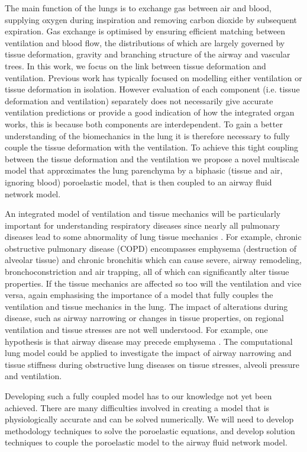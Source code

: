 The main function of the lungs is to exchange gas between air and blood, supplying oxygen during inspiration and removing carbon dioxide by subsequent expiration. Gas exchange is optimised by ensuring efficient matching between ventilation and blood flow, the distributions of which are largely governed by tissue deformation, gravity and branching structure of the airway and vascular trees. In this work, we focus on the link between tissue deformation and ventilation. Previous work has typically focused on modelling either ventilation or tissue deformation in isolation. However evaluation of each component (i.e. tissue deformation and ventilation) separately does not necessarily give accurate ventilation predictions or provide a good indication of how the integrated organ works, this is because both components are interdependent. To gain a better understanding of the biomechanics in the lung it is therefore necessary to fully couple the tissue deformation with the ventilation. To achieve this tight coupling between the tissue deformation and the ventilation we propose a novel multiscale model that approximates the lung parenchyma by a biphasic (tissue and air, ignoring blood) poroelastic model, that is then coupled to an airway fluid network model. 

An integrated model of ventilation and tissue mechanics will be particularly important for understanding respiratory diseases since nearly all pulmonary diseases lead to some abnormality of lung tissue mechanics \cite{suki2011lung}. For example, chronic obstructive pulmonary disease (COPD) encompasses emphysema (destruction of alveolar tissue) and chronic bronchitis which can cause severe, airway remodeling, bronchoconstriction and air trapping, all of which can significantly alter tissue properties. If the tissue mechanics are affected so too will the ventilation and vice versa, again emphasising the importance of a model that fully couples the ventilation and tissue mechanics in the lung. The impact of alterations during disease, such as airway narrowing or changes in tissue properties, on regional ventilation and tissue stresses are not well understood. For example, one hypothesis is that airway disease may precede emphysema \cite{galban2012computed}. The computational lung model could be applied to investigate the impact of airway narrowing and tissue stiffness during obstructive lung diseases on tissue stresses, alveoli pressure and ventilation.

Developing such a fully coupled model has to our knowledge not yet been achieved. There are many difficulties involved in creating a model that is physiologically accurate and can be solved numerically. We will need to develop methodology techniques to solve the poroelastic equations, and develop solution techniques to couple the poroelastic model to the airway fluid network model.

